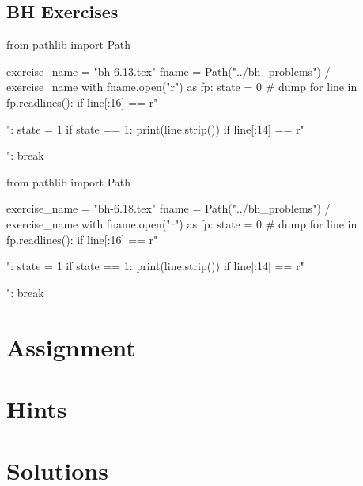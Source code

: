 \subsection{BH Exercises}
\label{sec:bh-exercises-1}


\begin{pycode}
from pathlib import Path

exercise_name = "bh-6.13.tex"
fname = Path("../bh_problems") / exercise_name
with fname.open("r") as fp:
    state = 0  # dump
    for line in fp.readlines():
        if line[:16] == r"\begin{exercise}":
            state = 1
        if state == 1:
            print(line.strip())
        if line[:14] == r"\end{exercise}":
            break
\end{pycode}

\begin{pycode}
from pathlib import Path

exercise_name = "bh-6.18.tex"
fname = Path("../bh_problems") / exercise_name
with fname.open("r") as fp:
    state = 0  # dump
    for line in fp.readlines():
        if line[:16] == r"\begin{exercise}":
            state = 1
        if state == 1:
            print(line.strip())
        if line[:14] == r"\end{exercise}":
            break
\end{pycode}



\section{Assignment}
\label{sec:assignment}

\setcounter{theorem}{0}

%





\clearpage
\section{Hints}

\clearpage
\section{Solutions}



